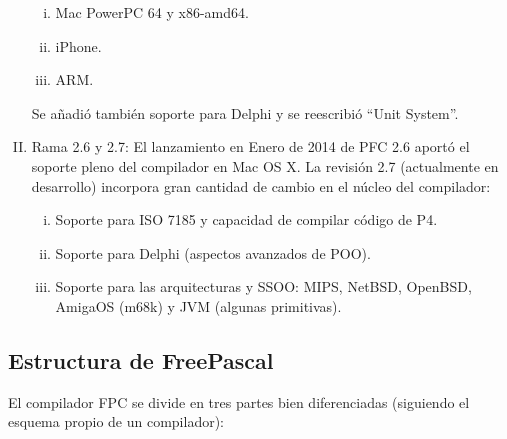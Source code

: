 \begin{enumerate}[I.]
\begin{enumerate}[i.]
\item Mac PowerPC 64 y x86-amd64.

\item iPhone.

\item ARM.

\end{enumerate}

Se añadió también soporte para Delphi y se reescribió ``Unit System''.

\item Rama 2.6 y 2.7: El lanzamiento en Enero de 2014 de PFC 2.6 aportó el soporte pleno del compilador en Mac OS X. La revisión 2.7 (actualmente en desarrollo) incorpora gran cantidad de cambio en el núcleo del compilador:

\begin{enumerate}[i.]

\item Soporte para ISO 7185 y capacidad de compilar código de P4.

\item Soporte para Delphi (aspectos avanzados de POO).

\item Soporte para las arquitecturas y SSOO: MIPS, NetBSD, OpenBSD, AmigaOS (m68k) y JVM (algunas primitivas).


\end{enumerate}

\end{enumerate}

\subsection{Estructura de FreePascal}

El compilador FPC se divide en tres partes bien diferenciadas (siguiendo el esquema propio de un compilador):

